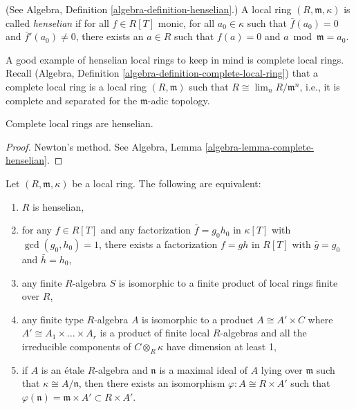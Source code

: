 \begin{definition}
\label{definition-henselian}
(See Algebra, Definition \ref{algebra-definition-henselian}.)
A local ring $(R, \mathfrak m, \kappa)$ is called
{\it henselian} if for all
$f \in R[T]$ monic, for all $a_0 \in \kappa$ such that
$\bar f(a_0) = 0$ and $\bar f'(a_0) \neq 0$, there exists
an $a \in R$ such that $f(a) = 0$ and $a \bmod \mathfrak m = a_0$.
\end{definition}

\noindent
A good example of henselian local rings
to keep in mind is complete local rings.
Recall
(Algebra, Definition \ref{algebra-definition-complete-local-ring})
that a complete local ring is a local ring $(R, \mathfrak m)$ such that
$R \cong \lim_n R/\mathfrak m^n$, i.e., it is complete and separated
for the $\mathfrak m$-adic topology.

\begin{theorem}
\label{theorem-hensel}
Complete local rings are henselian.
\end{theorem}

\begin{proof}
Newton's method. See
Algebra, Lemma \ref{algebra-lemma-complete-henselian}.
\end{proof}

\begin{theorem}
\label{theorem-henselian}
Let $(R, \mathfrak m, \kappa)$ be a local ring. The following are equivalent:
\begin{enumerate}
\item $R$ is henselian,
\item for any $f\in R[T]$ and any factorization $\bar f = g_0 h_0$ in
$\kappa[T]$ with $\gcd(g_0, h_0)=1$, there exists a factorization $f = gh$ in
$R[T]$ with $\bar g = g_0$ and $\bar h = h_0$,
\item any finite $R$-algebra $S$ is isomorphic to a finite product of
local rings finite over $R$,
\item any finite type $R$-algebra $A$ is isomorphic to a product
$A \cong A' \times C$ where $A' \cong A_1 \times \ldots \times A_r$
is a product of finite local $R$-algebras and all the irreducible
components of $C \otimes_R \kappa$ have dimension at least 1,
\item if $A$ is an \'etale $R$-algebra and $\mathfrak n$ is a maximal ideal of
$A$ lying over $\mathfrak m$ such that $\kappa \cong A/\mathfrak n$, then there
exists an isomorphism $\varphi : A \cong R \times A'$ such that
$\varphi(\mathfrak n) = \mathfrak m \times A' \subset R \times A'$.
\end{enumerate}
\end{theorem}

